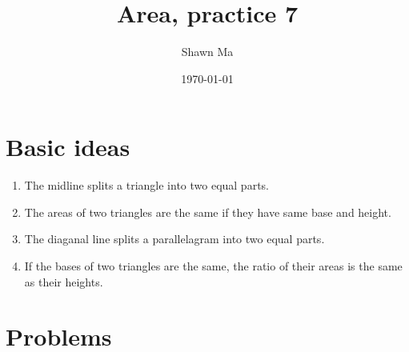 \documentclass[letterpaper,12pt]{article}
\author{Shawn Ma}
\date{\today}
\title{Area, practice 7}
\begin{document}
\section*{Basic ideas}
\begin{enumerate}
    \item The midline splits a triangle into two equal parts.
    \item The areas of two triangles are the same if they have same base and height.
    \item The diaganal line splits a parallelagram into two equal parts.
    \item If the bases of two triangles are the same, the ratio of their areas is the same as their heights.
\end{enumerate}
\section*{Problems}
\setlength{\parindent}{0pt}
\end{document}
